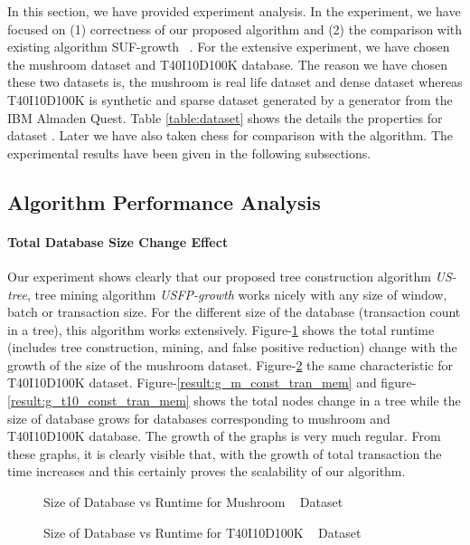 \documentclass[conference]{IEEEtran}
\begin{document}
In this section, we have provided experiment analysis. In the experiment, we have focused on (1) correctness of our proposed algorithm and (2) the comparison with existing algorithm SUF-growth ~\cite{suf_growth}. For the extensive experiment, we have chosen the mushroom dataset  and T40I10D100K database. The reason we have chosen these two datasets is, the mushroom  is real life dataset and dense dataset whereas T40I10D100K  is synthetic and sparse dataset generated by a generator from the IBM Almaden Quest. Table \ref{table:dataset} shows the details the properties for dataset . Later we have also taken chess  for comparison with the algorithm. The experimental results have been given in the following subsections.
\subsection{Algorithm Performance Analysis}

\paragraph{Total Database Size Change Effect}Our experiment shows clearly that our proposed tree construction algorithm \emph{US-tree}, tree mining algorithm \emph{USFP-growth} works nicely with any size of window, batch or transaction size. For the different size of the database (transaction count in a tree), this algorithm works extensively. Figure-\ref{result:g_m_const_tran} shows the total runtime (includes tree construction, mining, and false positive reduction) change with the growth of the size of the mushroom dataset. Figure-\ref{result:g_t10_const_tran} the same characteristic for T40I10D100K dataset. Figure-\ref{result:g_m_const_tran_mem} and figure-\ref{result:g_t10_const_tran_mem} shows the total nodes change in a tree while the size of database grows for databases corresponding to mushroom and T40I10D100K database. The growth of the graphs is very much regular. From these graphs, it is clearly visible that, with the growth of total transaction the time increases and this certainly proves the scalability of our algorithm. 

        \begin{figure}[h]
        \centering
            
        \caption{Size of Database vs Runtime for Mushroom ~\cite{dataset} Dataset }
        \label{result:g_m_const_tran}
        \end{figure}
        \begin{figure}[h]
        \centering
            
        \caption{Size of Database vs Runtime for T40I10D100K ~\cite{dataset} Dataset }
        \label{result:g_t10_const_tran}
        \end{figure}
    
\end{document}
